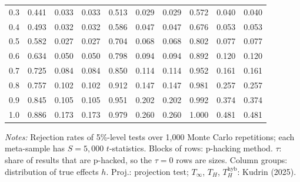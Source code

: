 \begin{table}[htbp]
\begin{tabular}{lccccccccc}
0.3 & 0.441 & 0.033 & 0.033 & 0.513 & 0.029 & 0.029 & 0.572 & 0.040 & 0.040 \\
0.4 & 0.493 & 0.032 & 0.032 & 0.586 & 0.047 & 0.047 & 0.676 & 0.053 & 0.053 \\
0.5 & 0.582 & 0.027 & 0.027 & 0.704 & 0.068 & 0.068 & 0.802 & 0.077 & 0.077 \\
0.6 & 0.634 & 0.050 & 0.050 & 0.798 & 0.094 & 0.094 & 0.892 & 0.120 & 0.120 \\
0.7 & 0.725 & 0.084 & 0.084 & 0.850 & 0.114 & 0.114 & 0.952 & 0.161 & 0.161 \\
0.8 & 0.757 & 0.102 & 0.102 & 0.912 & 0.147 & 0.147 & 0.981 & 0.257 & 0.257 \\
0.9 & 0.845 & 0.105 & 0.105 & 0.951 & 0.202 & 0.202 & 0.992 & 0.374 & 0.374 \\
1.0 & 0.886 & 0.173 & 0.173 & 0.979 & 0.260 & 0.260 & 1.000 & 0.481 & 0.481 \\
\bottomrule
\end{tabular}
\par\smallskip
\begin{minipage}{\linewidth}\footnotesize\textit{Notes:} Rejection rates of 5\%-level tests over 1,000 Monte Carlo repetitions; each meta-sample has $S = 5{,}000$ $t$-statistics. Blocks of rows: p-hacking method. $\tau$: share of results that are p-hacked, so the $\tau = 0$ rows are sizes. Column groups: distribution of true effects $h$. Proj.: projection test; $T_\infty$, $T_H$, $T_H^{\mathrm{hyb}}$: Kudrin (2025).\end{minipage}
\end{table}
